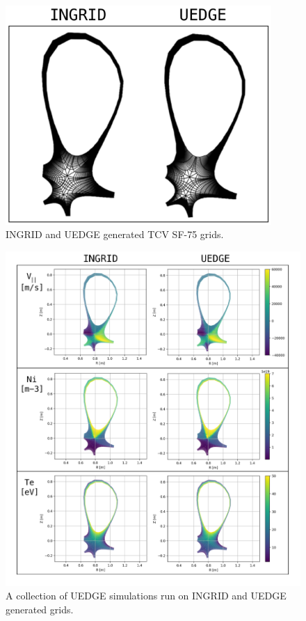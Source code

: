 \begin{figure}[H]
    \centering
        \includegraphics[width=0.9\textwidth]{figures/benchmark/gridue_both.pdf}
        \caption{INGRID and UEDGE generated TCV SF-75 grids.}
        \label{fig:ingrid_grid}
\end{figure}
\begin{figure}[H]
    \centering
        \includegraphics[width=\textwidth]{figures/benchmark/BenchmarkCollection.pdf}
        \caption{A collection of UEDGE simulations run on INGRID and UEDGE generated grids.}
        \label{fig:benchmark_collection}
\end{figure}

